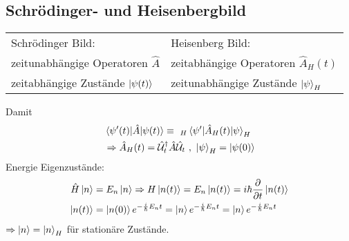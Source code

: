 	\subsection{Schrödinger- und Heisenbergbild}
		\begin{tabular*}{\linewidth}{l l}
			Schrödinger Bild: & Heisenberg Bild: \\ %
			zeitunabhängige Operatoren $\hat{A}$ & zeitabhängige Operatoren $\hat{A}_H(t)$ \\
			zeitabhängige Zustände $\ket{\psi(t)}$ & zeitunabhängige Zustände $\ket{\psi}_H$
		\end{tabular*}
	Damit 
		\begin{align*} %
			&\braket{\psi'(t) | \hat{A} | \psi(t)} \equiv~_H\braket{\psi' | \hat{A}_H(t) | \psi}_H \\
			&\Rightarrow \hat{A}_H(t) = \hat{\U}_t^\dagger \hat{A} \hat{\U}_t ~,~ \ket{\psi}_H = \ket{\psi(0)}
		\end{align*}	
	Energie Eigenzustände:
		\begin{align*}
			\hat{H} \ket{n} &= E_n \ket{n} \Rightarrow H \ket{n(t)} = E_n \ket{n(t)} = i\hbar \frac{\partial}{\partial t} \ket{n(t)} \\
			\ket{n(t)} &= \ket{n(0)} e^{-\frac{i}{\hbar} E_n t} = \ket{n} e^{- \frac{i}{\hbar} E_n t} = \ket{n} e^{-\frac{i}{\hbar} E_n t} 
		\end{align*}
	$\Rightarrow \ket{n} = \ket{n}_H$ für \grqq stationäre \grqq Zustände.
	
